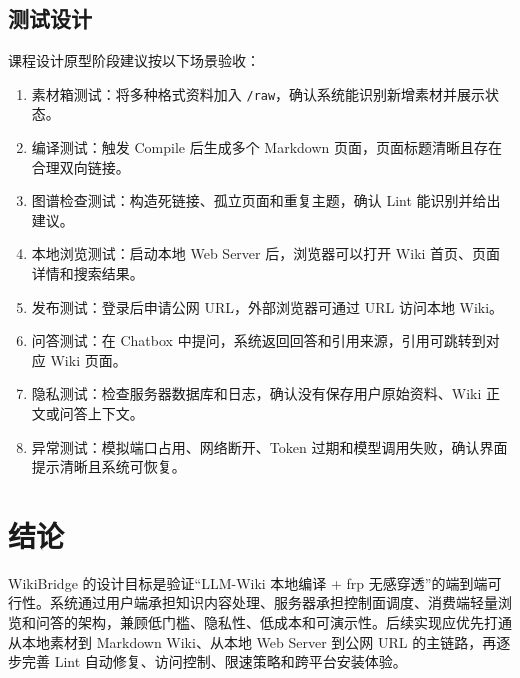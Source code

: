 \documentclass[UTF8,a4paper,12pt,fontset=fandol]{ctexart}
\newcommand{\code}[1]{\texttt{\footnotesize #1}}
\begin{document}
\subsection{测试设计}
课程设计原型阶段建议按以下场景验收：
\begin{enumerate}
  \item 素材箱测试：将多种格式资料加入 \code{/raw}，确认系统能识别新增素材并展示状态。
  \item 编译测试：触发 Compile 后生成多个 Markdown 页面，页面标题清晰且存在合理双向链接。
  \item 图谱检查测试：构造死链接、孤立页面和重复主题，确认 Lint 能识别并给出建议。
  \item 本地浏览测试：启动本地 Web Server 后，浏览器可以打开 Wiki 首页、页面详情和搜索结果。
  \item 发布测试：登录后申请公网 URL，外部浏览器可通过 URL 访问本地 Wiki。
  \item 问答测试：在 Chatbox 中提问，系统返回回答和引用来源，引用可跳转到对应 Wiki 页面。
  \item 隐私测试：检查服务器数据库和日志，确认没有保存用户原始资料、Wiki 正文或问答上下文。
  \item 异常测试：模拟端口占用、网络断开、Token 过期和模型调用失败，确认界面提示清晰且系统可恢复。
\end{enumerate}

\section*{结论}
WikiBridge 的设计目标是验证“LLM-Wiki 本地编译 + frp 无感穿透”的端到端可行性。系统通过用户端承担知识内容处理、服务器承担控制面调度、消费端轻量浏览和问答的架构，兼顾低门槛、隐私性、低成本和可演示性。后续实现应优先打通从本地素材到 Markdown Wiki、从本地 Web Server 到公网 URL 的主链路，再逐步完善 Lint 自动修复、访问控制、限速策略和跨平台安装体验。
\end{document}
